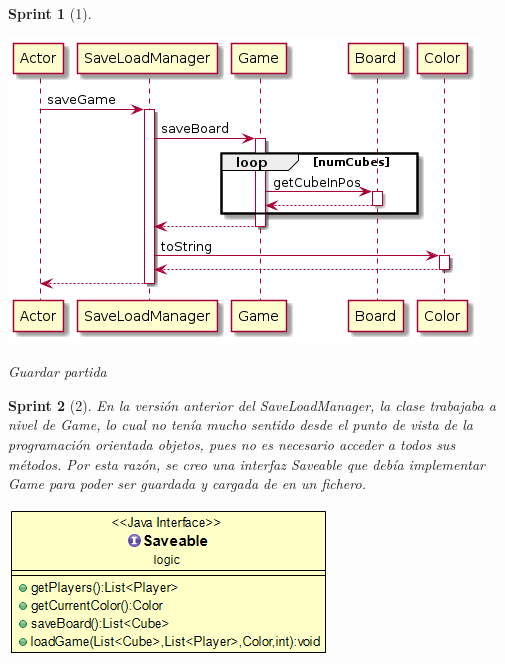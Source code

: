 \documentclass{article}
\theoremstyle{break}
\newtheorem*{sprint}{Sprint}
\begin{document}
\begin{sprint}[1]
\begin{center}
\centering
\includegraphics[scale=0.5]{save-game-sprint1.png}

Guardar partida
\end{center}
\end{sprint}

\begin{sprint}[2]
En la versión anterior del \textit{SaveLoadManager}, la clase trabajaba a nivel de \textit{Game}, lo cual no tenía mucho sentido desde el punto de vista de la programación orientada objetos, pues no es necesario acceder a todos sus métodos. Por esta razón, se creo una interfaz \textit{Saveable} que debía implementar \textit{Game} para poder ser guardada y cargada de en un fichero.

\begin{center}
\centering
\includegraphics[scale=0.5]{saveable-sprint2.png}
\end{center}

\end{sprint}
\end{document}
